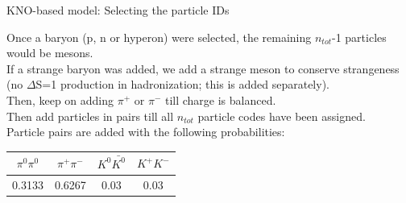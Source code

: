 \begin{frame}{KNO-based model: Selecting the particle IDs}

Once a baryon (p, n or hyperon) were selected, the remaining $n_{tot}$-1 particles would be mesons.\\
\vspace{0.1cm}
If a strange baryon was added, we add a strange meson to conserve strangeness (no ${\Delta}$S=1 
production in hadronization; this is added separately).\\
\vspace{0.1cm}
Then, keep on adding $\pi^{+}$ or $\pi^{-}$ till charge is balanced.\\
\vspace{0.1cm}
Then add particles in pairs till all $n_{tot}$ particle codes have been assigned.\\
Particle pairs are added with the following probabilities:\\
\begin{table}[ht]
\centering
\begin{tabular}{| c | c | c | c |}
\hline
       $\pi^{0}\pi^{0}$   & $\pi^{+}\pi^{-}$     &  $K^{0}\bar{K^{0}}$  & $K^{+}K^{-}$ \\
\hline
       0.3133             &  0.6267              &  0.03                & 0.03  \\
\hline
\end{tabular}
\end{table}

\end{frame}




